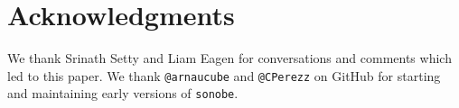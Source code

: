 \section*{Acknowledgments}

We thank Srinath Setty and Liam Eagen for 
conversations and comments which led to this paper. We thank \texttt{@arnaucube} and \texttt{@CPerezz} on GitHub for starting and maintaining early versions of \texttt{sonobe}.

